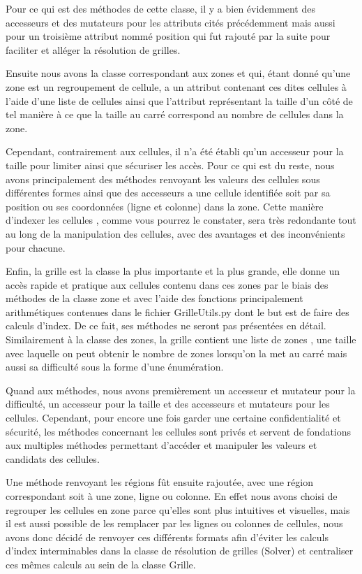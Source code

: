 \documentclass[a4paper]{article}
\begin{document}
Pour ce qui est des méthodes de cette classe, il y a bien évidemment des accesseurs et des mutateurs pour les attributs cités précédemment mais aussi pour un troisième attribut nommé position qui fut rajouté par la suite pour faciliter et alléger la résolution de grilles.

Ensuite nous avons la classe correspondant aux zones et qui, étant donné qu’une zone est un regroupement de cellule, a un attribut contenant ces dites cellules à l’aide d’une liste de cellules ainsi que l’attribut représentant la taille d’un côté de tel manière à ce que la taille au carré correspond au nombre de cellules dans la zone. 

Cependant, contrairement aux cellules, il n’a été établi qu’un accesseur pour la taille pour limiter ainsi que sécuriser les accès. Pour ce qui est du reste, nous avons principalement des méthodes renvoyant les valeurs des cellules sous différentes formes ainsi que des accesseurs a une cellule identifiée soit par sa position ou ses coordonnées (ligne et colonne) dans la zone. Cette manière d’indexer les cellules , comme vous pourrez le constater, sera très redondante tout au long de la manipulation des cellules, avec des avantages et des inconvénients pour chacune.
	
Enfin, la grille est la classe la plus importante et la plus grande, elle donne un accès rapide et pratique aux cellules contenu dans ces zones par le biais des méthodes de la classe zone et avec l’aide des fonctions principalement arithmétiques contenues dans le fichier GrilleUtils.py dont le but est de faire des calculs d’index. De ce fait, ses méthodes ne seront pas présentées en détail. Similairement à la classe des zones, la grille contient une liste de zones , une taille avec laquelle on peut obtenir le nombre de zones lorsqu’on la met au carré mais aussi sa difficulté sous la forme d’une énumération.

Quand aux méthodes, nous avons premièrement un accesseur et mutateur pour la difficulté, un accesseur pour la taille et des accesseurs et mutateurs pour les cellules. Cependant, pour encore une fois garder une certaine confidentialité et sécurité, les méthodes concernant les cellules sont privés et servent de fondations aux multiples méthodes permettant d’accéder et manipuler les valeurs et candidats des cellules. 

Une méthode renvoyant les régions fût ensuite rajoutée, avec une région correspondant soit à une zone, ligne ou colonne. En effet nous avons choisi de regrouper les cellules en zone parce qu’elles sont plus intuitives et visuelles, mais il est aussi possible de les remplacer par les lignes ou colonnes de cellules, nous avons donc décidé de renvoyer ces différents formats afin d’éviter les calculs d’index interminables dans la classe de résolution de grilles (Solver) et centraliser ces mêmes calculs au sein de la classe Grille.
\end{document}
